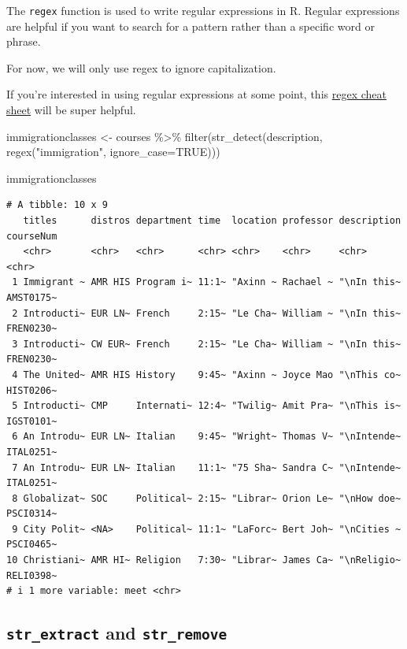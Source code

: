 \documentclass[
  letterpaper,
  DIV=11,
  numbers=noendperiod]{scrartcl}
\newenvironment{Shaded}{\begin{snugshade}}{\end{snugshade}}
\newcommand{\AttributeTok}[1]{\textcolor[rgb]{0.40,0.45,0.13}{#1}}
\newcommand{\ConstantTok}[1]{\textcolor[rgb]{0.56,0.35,0.01}{#1}}
\newcommand{\FunctionTok}[1]{\textcolor[rgb]{0.28,0.35,0.67}{#1}}
\newcommand{\NormalTok}[1]{\textcolor[rgb]{0.00,0.23,0.31}{#1}}
\newcommand{\OtherTok}[1]{\textcolor[rgb]{0.00,0.23,0.31}{#1}}
\newcommand{\SpecialCharTok}[1]{\textcolor[rgb]{0.37,0.37,0.37}{#1}}
\newcommand{\StringTok}[1]{\textcolor[rgb]{0.13,0.47,0.30}{#1}}
\begin{document}
The \texttt{regex} function is used to write regular expressions in R.
Regular expressions are helpful if you want to search for a pattern
rather than a specific word or phrase.

For now, we will only use regex to ignore capitalization.

If you're interested in using regular expressions at some point, this
\href{https://cheatography.com/davechild/cheat-sheets/regular-expressions/}{regex
cheat sheet} will be super helpful.

\begin{Shaded}
\begin{Highlighting}[]
\NormalTok{immigrationclasses }\OtherTok{\textless{}{-}}\NormalTok{ courses }\SpecialCharTok{\%\textgreater{}\%} 
  \FunctionTok{filter}\NormalTok{(}\FunctionTok{str\_detect}\NormalTok{(description, }\FunctionTok{regex}\NormalTok{(}\StringTok{"immigration"}\NormalTok{, }\AttributeTok{ignore\_case=}\ConstantTok{TRUE}\NormalTok{)))}

\NormalTok{immigrationclasses}
\end{Highlighting}
\end{Shaded}

\begin{verbatim}
# A tibble: 10 x 9
   titles      distros department time  location professor description courseNum
   <chr>       <chr>   <chr>      <chr> <chr>    <chr>     <chr>       <chr>    
 1 Immigrant ~ AMR HIS Program i~ 11:1~ "Axinn ~ Rachael ~ "\nIn this~ AMST0175~
 2 Introducti~ EUR LN~ French     2:15~ "Le Cha~ William ~ "\nIn this~ FREN0230~
 3 Introducti~ CW EUR~ French     2:15~ "Le Cha~ William ~ "\nIn this~ FREN0230~
 4 The United~ AMR HIS History    9:45~ "Axinn ~ Joyce Mao "\nThis co~ HIST0206~
 5 Introducti~ CMP     Internati~ 12:4~ "Twilig~ Amit Pra~ "\nThis is~ IGST0101~
 6 An Introdu~ EUR LN~ Italian    9:45~ "Wright~ Thomas V~ "\nIntende~ ITAL0251~
 7 An Introdu~ EUR LN~ Italian    11:1~ "75 Sha~ Sandra C~ "\nIntende~ ITAL0251~
 8 Globalizat~ SOC     Political~ 2:15~ "Librar~ Orion Le~ "\nHow doe~ PSCI0314~
 9 City Polit~ <NA>    Political~ 11:1~ "LaForc~ Bert Joh~ "\nCities ~ PSCI0465~
10 Christiani~ AMR HI~ Religion   7:30~ "Librar~ James Ca~ "\nReligio~ RELI0398~
# i 1 more variable: meet <chr>
\end{verbatim}

\hypertarget{str_extract-and-str_remove}{%
\subsection{\texorpdfstring{\texttt{str\_extract} and
\texttt{str\_remove}}{str\_extract and str\_remove}}\label{str_extract-and-str_remove}}
\end{document}

